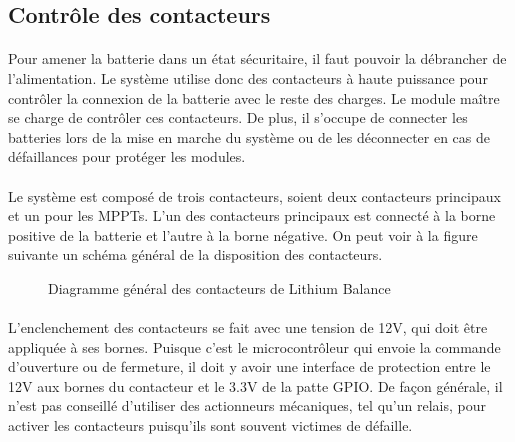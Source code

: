 
\subsection{Contrôle des contacteurs}

	\paragraph*{}
	Pour amener la batterie dans un état sécuritaire, il faut pouvoir la débrancher de l'alimentation. Le système utilise donc des contacteurs à haute puissance pour contrôler la connexion de la batterie avec le reste des charges. Le module maître se charge de contrôler ces contacteurs. De plus, il s'occupe de connecter les batteries lors de la mise en marche du système ou de les déconnecter en cas de défaillances pour protéger les modules.

	\paragraph*{}
	Le système est composé de trois contacteurs, soient deux contacteurs principaux et un pour les MPPTs. L'un des contacteurs principaux est connecté à la borne positive de la batterie et l'autre à la borne négative. On peut voir à la figure suivante un schéma général de la disposition des contacteurs. 
	
	\begin{figure}[H]
		\centering
		\caption{Diagramme général des contacteurs de Lithium Balance \cite{Lithium_Balance}}
		\label{fig:lithiumbalancecontactordiagram}
	\end{figure}

	\paragraph*{}
	L'enclenchement des contacteurs se fait avec une tension de 12V, qui doit être appliquée à ses bornes. Puisque c'est le microcontrôleur qui envoie la commande d'ouverture ou de fermeture, il doit y avoir une interface de protection entre le 12V aux bornes du contacteur et le 3.3V de la patte GPIO. De façon générale, il n'est pas conseillé d'utiliser des actionneurs mécaniques, tel qu'un relais, pour activer les contacteurs puisqu'ils sont souvent victimes de défaille. 	 

